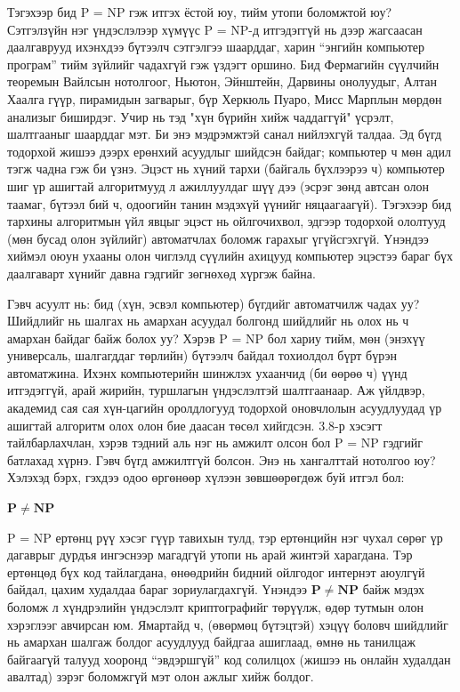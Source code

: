 Тэгэхээр бид P = NP гэж итгэх ёстой юу, тийм утопи боломжтой юу? Сэтгэлзүйн нэг үндэслэлээр хүмүүс P = NP-д итгэдэггүй нь дээр жагсаасан даалгаврууд ихэнхдээ бүтээлч сэтгэлгээ шаарддаг, харин “энгийн компьютер програм” тийм зүйлийг чадахгүй гэж үздэгт оршино. Бид Фермагийн сүүлчийн теоремын Вайлсын нотолгоог, Ньютон, Эйнштейн, Дарвины онолуудыг, Алтан Хаалга гүүр, пирамидын загварыг, бүр Херкюль Пуаро, Мисс Марплын мөрдөн анализыг биширдэг. Учир нь тэд "хүн бүрийн хийж чаддаггүй" үсрэлт, шалтгааныг шаарддаг мэт. Би энэ мэдрэмжтэй санал нийлэхгүй талдаа. Эд бүгд тодорхой жишээ дээрх ерөнхий асуудлыг шийдсэн байдаг; компьютер ч мөн адил тэгж чадна гэж би үзнэ. Эцэст нь хүний тархи (байгаль бүхлээрээ ч) компьютер шиг үр ашигтай алгоритмууд л ажиллуулдаг шүү дээ (эсрэг зөнд автсан олон таамаг, бүтээл бий ч, одоогийн танин мэдэхүй үүнийг няцаагаагүй). Тэгэхээр бид тархины алгоритмын үйл явцыг эцэст нь ойлгочихвол, эдгээр тодорхой ололтууд (мөн бусад олон зүйлийг) автоматчлах боломж гарахыг үгүйсгэхгүй. Үнэндээ хиймэл оюун ухааны олон чиглэлд сүүлийн ахицууд компьютер эцэстээ бараг бүх даалгаварт хүнийг давна гэдгийг зөгнөхөд хүргэж байна.


Гэвч асуулт нь: бид (хүн, эсвэл компьютер) бүгдийг автоматчилж чадах уу? Шийдлийг нь шалгах нь амархан асуудал болгонд шийдлийг нь олох нь ч амархан байдаг байж болох уу? Хэрэв P = NP бол хариу тийм, мөн (энэхүү универсаль, шалгагддаг төрлийн) бүтээлч байдал тохиолдол бүрт бүрэн автоматжина. Ихэнх компьютерийн шинжлэх ухаанчид (би өөрөө ч) үүнд итгэдэггүй, арай жирийн, туршлагын үндэслэлтэй шалтгаанаар. Аж үйлдвэр, академид сая сая хүн-цагийн оролдлогууд тодорхой оновчлолын асуудлуудад үр ашигтай алгоритм олох олон бие даасан төсөл хийгдсэн. 3.8-р хэсэгт тайлбарлахчлан, хэрэв тэдний аль нэг нь амжилт олсон бол P = NP гэдгийг батлахад хүрнэ. Гэвч бүгд амжилтгүй болсон. Энэ нь хангалттай нотолгоо юу? Хэлэхэд бэрх, гэхдээ одоо өргөнөөр хүлээн зөвшөөрөгдөж буй итгэл бол:


\begin{conjecture}
$\mathbf{P} \ne \mathbf{NP}$
\end{conjecture}


P = NP ертөнц рүү хэсэг гүүр тавихын тулд, тэр ертөнцийн нэг чухал сөрөг үр дагаврыг дурдъя ингэснээр магадгүй утопи нь арай жинтэй харагдана. Тэр ертөнцөд бүх код тайлагдана, өнөөдрийн бидний ойлгодог интернэт аюулгүй байдал, цахим худалдаа бараг зориулагдахгүй. Үнэндээ $\mathbf{P} \ne \mathbf{NP}$ байж мэдэх боломж л хүндрэлийн үндэслэлт криптографийг төрүүлж, өдөр тутмын олон хэрэглээг авчирсан юм. Ямартайд ч, (өвөрмөц бүтэцтэй) хэцүү боловч шийдлийг нь амархан шалгаж болдог асуудлууд байдгаа ашиглаад, өмнө нь танилцаж байгаагүй талууд хооронд “эвдэршгүй” код солилцох (жишээ нь онлайн худалдан авалтад) зэрэг боломжгүй мэт олон ажлыг хийж болдог.


